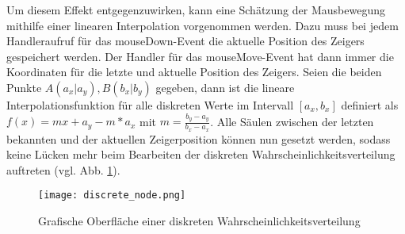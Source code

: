 Um diesem Effekt entgegenzuwirken, kann eine Schätzung der Mausbewegung mithilfe einer linearen Interpolation vorgenommen werden. Dazu muss bei jedem Handleraufruf für das mouseDown-Event die aktuelle Position des Zeigers gespeichert werden. Der Handler für das mouseMove-Event hat dann immer die Koordinaten für die letzte und aktuelle Position des Zeigers. Seien die beiden Punkte $A(a_x|a_y), B(b_x|b_y)$ gegeben, dann ist die lineare Interpolationsfunktion für alle diskreten Werte im Intervall $[a_x,b_x]$ definiert als $f(x)=mx+a_y-m*a_x$ mit $m=\frac{b_y-a_y}{b_x-a_x}$. Alle Säulen zwischen der letzten bekannten und der aktuellen Zeigerposition können nun gesetzt werden, sodass keine Lücken mehr beim Bearbeiten der diskreten Wahrscheinlichkeitsverteilung auftreten (vgl. Abb. \ref{fig:discretenode}).

\begin{figure}[H]
    \centering
    \texttt{[image: discrete\_node.png]}
    \caption{Grafische Oberfläche einer diskreten Wahrscheinlichkeitsverteilung}\label{fig:discretenode}
\end{figure}